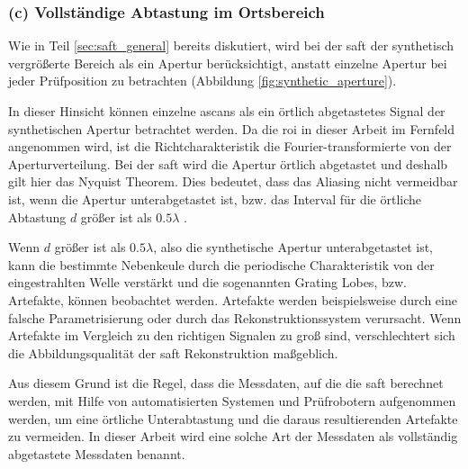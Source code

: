 \subsubsection*{(c) Vollständige Abtastung im Ortsbereich} \label{sec:undersampling}
Wie in Teil \ref{sec:saft_general} bereits diskutiert, wird bei der \acrshort{saft} der synthetisch vergrößerte Bereich als ein Apertur berücksichtigt, anstatt einzelne Apertur bei jeder Prüfposition zu betrachten (Abbildung \ref{fig:synthetic_aperture}). \par
In dieser Hinsicht können einzelne \glspl{ascan} als ein örtlich abgetastetes Signal der synthetischen Apertur betrachtet werden. Da die \acrshort{roi} in dieser Arbeit im Fernfeld angenommen wird, ist die Richtcharakteristik die Fourier-transformierte von der Aperturverteilung. Bei der \acrshort{saft} wird die Apertur örtlich abgetastet und deshalb gilt hier das Nyquist Theorem. 
Dies bedeutet, dass das Aliasing nicht vermeidbar ist, wenn die Apertur unterabgetastet ist, bzw. das Interval für die örtliche Abtastung $d$ größer ist als $0.5 \lambda$ \cite{Lingvall04PhD}. \par
Wenn $d$ größer ist als $0.5 \lambda$, also die synthetische Apertur unterabgetastet ist, kann die bestimmte Nebenkeule durch die periodische Charakteristik von der eingestrahlten Welle verstärkt und die sogenannten Grating Lobes, bzw. Artefakte, können beobachtet werden. Artefakte werden beispielsweise durch eine falsche Parametrisierung oder durch das Rekonstruktionssystem verursacht. Wenn Artefakte im Vergleich zu den richtigen Signalen zu groß sind, verschlechtert sich die Abbildungsqualität der \acrshort{saft} Rekonstruktion maßgeblich. \par
Aus diesem Grund ist die Regel, dass die Messdaten, auf die die \acrshort{saft} berechnet werden, mit Hilfe von automatisierten Systemen und Prüfrobotern aufgenommen werden, um eine örtliche Unterabtastung und die daraus resultierenden Artefakte zu vermeiden. In dieser Arbeit wird eine solche Art der Messdaten als vollständig abgetastete Messdaten benannt. \par


